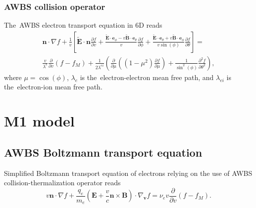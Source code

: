 \documentclass[review]{elsarticle}
\newcommand{\pdv}[2]{\frac{\partial{#1}}{\partial{#2}}}
\newcommand{\vect}[1]{\boldsymbol{#1}}
\newcommand{\mfpe}{\lambda_e}
\newcommand{\mfpei}{\lambda_{ei}}
\newcommand{\nue}{\nu_{e}}
\newcommand{\vmag}{v}
\newcommand{\vn}{\vect{n}}
\newcommand{\E}{\vect{E}}
\newcommand{\B}{\vect{B}}
\newcommand{\tE}{\vect{\tilde{E}}}
\newcommand{\tB}{\vect{\tilde{B}}}
\newcommand{\qe}{q_e}
\newcommand{\me}{m_e}
\newcommand{\fM}{f_M}
\begin{document}
\subsubsection{AWBS collision operator}
The~AWBS electron transport equation in 6D reads
\begin{multline}
  \vn\cdot\nabla f + \frac{1}{\vmag} \left[ \tE\cdot\vn \pdv{f}{\vmag} 
  + \frac{\tE\cdot\vect{e}_\phi 
  - \vmag\tB\cdot\vect{e}_\theta}{\vmag}\pdv{f}{\phi}
  + \frac{\tE\cdot\vect{e}_\theta + \vmag\tB\cdot\vect{e}_\phi}
  {\vmag\sin(\phi)}\pdv{f}{\theta} \right] 
  =\\
  \frac{\vmag}{\lambda^e}\pdv{}{\vmag}\left(f - f_M\right) 
  + \frac{1}{2 \lambda^{ei}} 
  \left(\pdv{}{\mu}\left((1 - \mu^2)\pdv{f}{\mu}\right)
  + \frac{1}{\sin^2(\phi)}\frac{\partial^2f}{\partial\theta^2} \right) ,
  \label{eq:AWBS_spherical}
\end{multline}
where $\mu = \cos(\phi)$, $\mfpe$ is the~electron-electron mean free path, and
$\mfpei$ is the~electron-ion mean free path.

\section{M1 model}\label{sec:m1_model}
\subsection{AWBS Boltzmann transport equation}
Simplified Boltzmann transport equation of electrons relying on the use of AWBS
collision-thermalization operator \cite{AWBS_PRL1986} reads
\begin{equation}
  \vmag\vn\cdot\nabla f + \frac{\qe}{\me}\left( \E + 
  \frac{\vmag}{c}\vn\times\B\right)\cdot\nabla_{\vect{v}} f = \nue \vmag 
  \pdv{}{\vmag}\left( f - \fM\right) .
  \label{eq:AWBS}
\end{equation}
\end{document}
